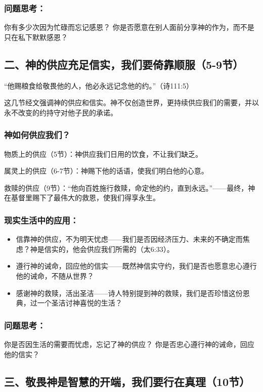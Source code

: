 \documentclass[a4paper, 12pt]{article}
\begin{document}
\subsubsection*{问题思考：}

你有多少次因为忙碌而忘记感恩？
你是否愿意在别人面前分享神的作为，而不是只在私下默默感恩？
\subsection*{二、神的供应充足信实，我们要倚靠顺服（5-9节）}
“他赐粮食给敬畏他的人，他必永远记念他的约。”（诗111:5）

这几节经文强调神的供应和信实。神不仅创造世界，更持续供应我们的需要，并以永不改变的约持守对他子民的承诺。

\subsubsection*{神如何供应我们？}

\hspace{0.6cm}物质上的供应（5节）：神供应我们日用的饮食，不让我们缺乏。

属灵上的供应（6-7节）：神赐下他的话语，使我们明白他的心意。

救赎的供应（9节）：“他向百姓施行救赎，命定他的约，直到永远。”——最终，神在基督里赐下了最伟大的救恩，使我们得享永生。
\subsubsection*{现实生活中的应用：}
\begin{itemize}
    \item 信靠神的供应，不为明天忧虑——我们是否因经济压力、未来的不确定而焦虑？神是信实的，他会供应我们所需的（太6:33）。

    \item 遵行神的诫命，回应他的信实——既然神信实守约，我们是否也愿意忠心遵行他的诫命，不随从世界？

    \item 感谢神的救赎，活出圣洁——诗人特别提到神的救赎，我们是否珍惜这份恩典，过一个圣洁讨神喜悦的生活？

\end{itemize}
\subsubsection*{问题思考：}

你是否因生活的需要而忧虑，忘记了神的供应？
你是否忠心遵行神的诫命，回应他的信实？
\subsection*{三、敬畏神是智慧的开端，我们要行在真理（10节）}
\end{document}
